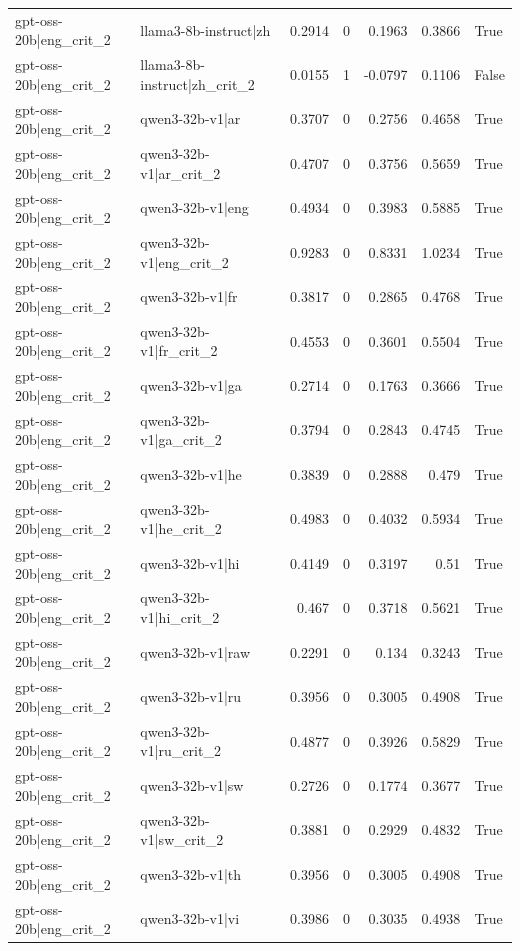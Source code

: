 \begin{table}
\begin{tabular}{l l r r r r l}
gpt-oss-20b|eng_crit_2 & llama3-8b-instruct|zh & 0.2914 & 0 & 0.1963 & 0.3866 & True \\
gpt-oss-20b|eng_crit_2 & llama3-8b-instruct|zh_crit_2 & 0.0155 & 1 & -0.0797 & 0.1106 & False \\
gpt-oss-20b|eng_crit_2 & qwen3-32b-v1|ar & 0.3707 & 0 & 0.2756 & 0.4658 & True \\
gpt-oss-20b|eng_crit_2 & qwen3-32b-v1|ar_crit_2 & 0.4707 & 0 & 0.3756 & 0.5659 & True \\
gpt-oss-20b|eng_crit_2 & qwen3-32b-v1|eng & 0.4934 & 0 & 0.3983 & 0.5885 & True \\
gpt-oss-20b|eng_crit_2 & qwen3-32b-v1|eng_crit_2 & 0.9283 & 0 & 0.8331 & 1.0234 & True \\
gpt-oss-20b|eng_crit_2 & qwen3-32b-v1|fr & 0.3817 & 0 & 0.2865 & 0.4768 & True \\
gpt-oss-20b|eng_crit_2 & qwen3-32b-v1|fr_crit_2 & 0.4553 & 0 & 0.3601 & 0.5504 & True \\
gpt-oss-20b|eng_crit_2 & qwen3-32b-v1|ga & 0.2714 & 0 & 0.1763 & 0.3666 & True \\
gpt-oss-20b|eng_crit_2 & qwen3-32b-v1|ga_crit_2 & 0.3794 & 0 & 0.2843 & 0.4745 & True \\
gpt-oss-20b|eng_crit_2 & qwen3-32b-v1|he & 0.3839 & 0 & 0.2888 & 0.479 & True \\
gpt-oss-20b|eng_crit_2 & qwen3-32b-v1|he_crit_2 & 0.4983 & 0 & 0.4032 & 0.5934 & True \\
gpt-oss-20b|eng_crit_2 & qwen3-32b-v1|hi & 0.4149 & 0 & 0.3197 & 0.51 & True \\
gpt-oss-20b|eng_crit_2 & qwen3-32b-v1|hi_crit_2 & 0.467 & 0 & 0.3718 & 0.5621 & True \\
gpt-oss-20b|eng_crit_2 & qwen3-32b-v1|raw & 0.2291 & 0 & 0.134 & 0.3243 & True \\
gpt-oss-20b|eng_crit_2 & qwen3-32b-v1|ru & 0.3956 & 0 & 0.3005 & 0.4908 & True \\
gpt-oss-20b|eng_crit_2 & qwen3-32b-v1|ru_crit_2 & 0.4877 & 0 & 0.3926 & 0.5829 & True \\
gpt-oss-20b|eng_crit_2 & qwen3-32b-v1|sw & 0.2726 & 0 & 0.1774 & 0.3677 & True \\
gpt-oss-20b|eng_crit_2 & qwen3-32b-v1|sw_crit_2 & 0.3881 & 0 & 0.2929 & 0.4832 & True \\
gpt-oss-20b|eng_crit_2 & qwen3-32b-v1|th & 0.3956 & 0 & 0.3005 & 0.4908 & True \\
gpt-oss-20b|eng_crit_2 & qwen3-32b-v1|vi & 0.3986 & 0 & 0.3035 & 0.4938 & True \\

\end{tabular}
\end{table}
